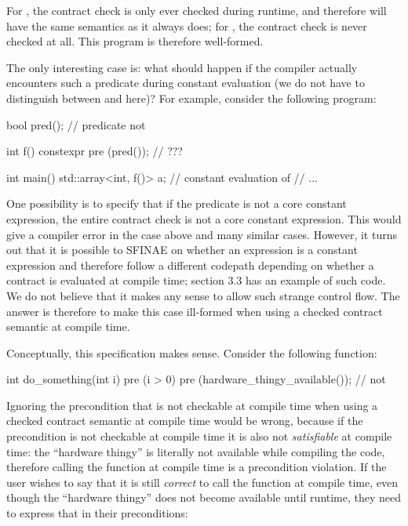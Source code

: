 For , the contract check is only ever checked during runtime, and therefore will have the same semantics as it always does; for , the contract check is never checked at all. This program is therefore well-formed.

The only interesting case is: what should happen if the compiler actually encounters such a predicate during constant evaluation (we do not have to distinguish between  and  here)? For example, consider the following program:

\begin{codeblock}
bool pred();  // predicate not 

int f() constexpr
  pre (pred());  // ???

int main() {
  std::array<int, f()> a;  // constant evaluation of 
  // ...
}
\end{codeblock}

One possibility is to specify that if the predicate is not a core constant expression, the entire contract check is not a core constant expression. This would give a compiler error in the case above and many similar cases. However, it turns out that it is possible to SFINAE on whether an expression is a constant expression and therefore follow a different codepath depending on whether a contract is evaluated at compile time; \cite{P2932R1} section 3.3 has an example of such code. We do not believe that it makes any sense to allow such strange control flow. The answer is therefore to make this case ill-formed when using a checked contract semantic at compile time.

Conceptually, this specification makes sense. Consider the following function:

\begin{codeblock}
int do_something(int i)
  pre (i > 0)
  pre (hardware_thingy_available());  // not 
\end{codeblock}

Ignoring the precondition that is not checkable at compile time when using a checked contract semantic at compile time would be wrong, because if the precondition is not checkable at compile time it is also not \emph{satisfiable} at compile time: the ``hardware thingy'' is literally not available while compiling the code, therefore calling the function at compile time is a precondition violation. If the user wishes to say that it is still \emph{correct} to call the function at compile time, even though the ``hardware thingy'' does not become available until runtime, they need to express that in their preconditions:

